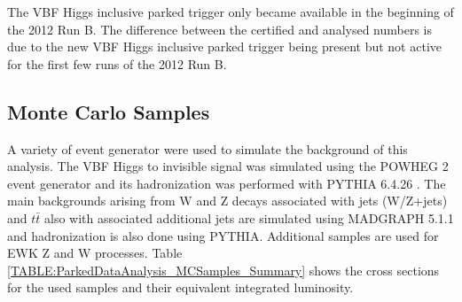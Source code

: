 

The \gls{VBF} Higgs inclusive parked trigger only became available in the beginning of the 2012 Run B. The difference between the certified and analysed numbers is due to the new \gls{VBF} Higgs inclusive parked trigger being present but not active for the first few runs of the 2012 Run B. 

\subsection{Monte Carlo Samples}


A variety of event generator were used to simulate the background of this analysis. The \gls{VBF} Higgs to invisible signal was simulated using the \textsc{POWHEG} 2 event generator \cite{ARTICLE:POWHEG_2004,ARTICLE:POWHEG_2007,ARTICLE:POWHEG_2009v1,ARTICLE:POWHEG_2009v2,ARTICLE:POWHEG_2010v1,ARTICLE:POWHEG_2010v2,ARTICLE:POWHEG_2011v1,ARTICLE:POWHEG_2011v2} and its hadronization was performed with \textsc{PYTHIA} 6.4.26 \cite{ARTICLE:Pythia6p4PhysicsAndManual}. The main backgrounds arising from W and Z decays associated with jets (W/Z+jets) and $t\bar{t}$ also with associated additional jets are simulated using \textsc{MADGRAPH} 5.1.1 \cite{ARTICLE:MadGraph5,ARTICLE:aMCatNLO} and hadronization is also done using \textsc{PYTHIA}. Additional samples are used for \gls{EWK} Z and W processes. Table \ref{TABLE:ParkedDataAnalysis_MCSamples_Summary} shows the cross sections for the used samples and their equivalent integrated luminosity.

